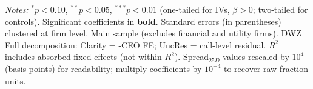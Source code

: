 \begin{landscape}
\begin{table}[H]
\begin{tabular}{lcccccccccccc}
\bottomrule
\end{tabular}
\begin{minipage}{\linewidth}
\vspace{2pt}\scriptsize
\textit{Notes:} $^{*}p<0.10$, $^{**}p<0.05$, $^{***}p<0.01$ (one-tailed for IVs, $\beta > 0$; two-tailed for controls).
 Significant coefficients in \textbf{bold}.
 Standard errors (in parentheses) clustered at firm level.
 Main sample (excludes financial and utility firms). DWZ Full decomposition: Clarity = -CEO FE; UncRes = call-level residual.
 $R^2$ includes absorbed fixed effects (not within-$R^2$).
 Spread$_{25D}$ values rescaled by $10^4$ (basis points) for readability; multiply coefficients by $10^{-4}$ to recover raw fraction units.
\end{minipage}
\end{table}
\end{landscape}